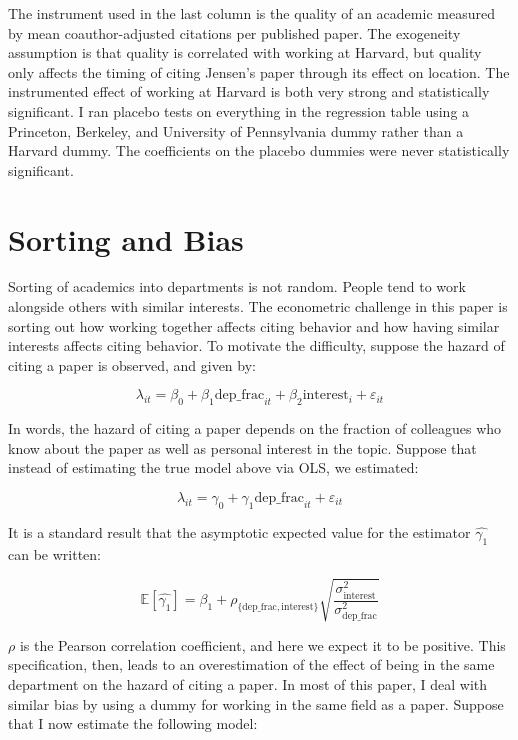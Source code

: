 The instrument used in the last column is the quality of an academic measured by
mean coauthor-adjusted citations per published paper. The exogeneity
assumption is that quality is correlated with working at Harvard, but
quality only affects the timing of citing Jensen's paper through its
effect on location. The instrumented effect of working at Harvard is
both very strong and statistically significant. I ran placebo tests on
everything in the regression table using a Princeton, Berkeley, and
University of Pennsylvania dummy rather than a Harvard dummy. The
coefficients on the placebo dummies were never statistically
significant.

\section{Sorting and Bias}
\label{sec:sortbias}

Sorting of academics into departments is not random. People tend to work
alongside others with similar interests. The econometric challenge in
this paper is sorting out how working together affects citing behavior
and how having similar interests affects citing behavior. To motivate
the difficulty, suppose the hazard of citing a paper is observed, and
given by:

\begin{equation}
\lambda_{it} = \beta_0 + \beta_1 \mbox{dep\_frac}_{it} + \beta_2 \mbox{interest}_i + \varepsilon_{it}
\end{equation}

In words, the hazard of citing a paper depends on the fraction of
colleagues who know about the paper as well as personal interest in the
topic. Suppose that instead of estimating the true model above via OLS,
we estimated:

\begin{equation}
\lambda_{it} = \gamma_0 + \gamma_1 \mbox{dep\_frac}_{it} + \varepsilon_{it}
\end{equation}

It is a standard result that the asymptotic expected value for the
estimator $\hat{\gamma_1}$ can be written:

\begin{equation}
    \mathbb{E}[\hat{\gamma_1}] = \beta_1 + \rho_{\{\mbox{dep\_frac},\mbox{interest}\}} \sqrt{\frac{\sigma_{\mbox{interest}}^2}{\sigma_{\mbox{dep\_frac}}^2}}
\end{equation}

$\rho$ is the Pearson correlation coefficient, and here we expect it to
be positive. This specification, then, leads to an overestimation of the
effect of being in the same department on the hazard of citing a paper.
In most of this paper, I deal with similar bias by using a dummy for
working in the same field as a paper. Suppose that I now estimate the
following model:

